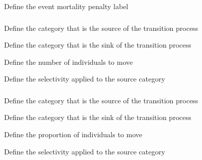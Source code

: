  {Define the event mortality penalty label}

\subsubsection[Category transition]{}

 {Define the category that is the source of the transition process}

 {Define the category that is the sink of the transition process}

 {Define the number of individuals to move}

 {Define the selectivity applied to the source category}

\subsubsection[Category transition rate]{}

 {Define the category that is the source of the transition process}

 {Define the category that is the sink of the transition process}

 {Define the proportion of individuals to move}

 {Define the selectivity applied to the source category}

\subsubsection[Preference movement]{}

